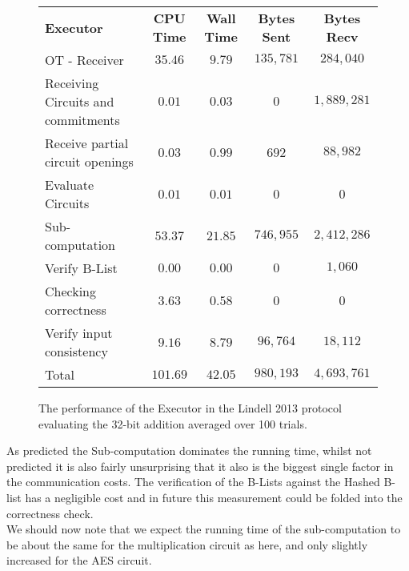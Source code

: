 \documentclass[ %
                    author={Nicholas Tutte},
                supervisor={Prof. Nigel Smart},
                    degree={MEng},
                     title={Secure Two Party Computation},
                  subtitle={A practical comparison of recent protocols},
                      type={Research - GG1K},
                      year={2015} ]{dissertation}
\begin{document}
				\begin{figure}[!ht]
					\begin{tabular}{| p{4.3cm} | c c c c |}
						\hline
						\textbf{Executor} & \textbf{CPU Time} & \textbf{Wall Time} & \textbf{Bytes Sent} & \textbf{Bytes Recv} \\
						\thickhline
						OT - Receiver & $35.46$ & $9.79$ & $135,781$ & $284,040$ \\
						\hline
						Receiving Circuits and commitments & $0.01$ & $0.03$ & $0$ & $1,889,281$ \\
						\hline
						Receive partial circuit openings & $0.03$ & $0.99$ & $692$ & $88,982$ \\
						\hline
						Evaluate Circuits & $0.01$ & $0.01$ & $0$ & $0$ \\
						\hline
						Sub-computation & $53.37$ & $21.85$ & $746,955$ & $2,412,286$ \\
						\hline
						Verify B-List & $0.00$ & $0.00$ & $0$ & $1,060$ \\
						\hline
						Checking correctness & $3.63$ & $0.58$ & $0$ & $0$ \\
						\hline
						Verify input consistency & $9.16$ & $8.79$ & $96,764$ & $18,112$ \\
						\thickhline
						Total & $101.69$ & $42.05$ & $980,193$ & $4,693,761$ \\
						\hline
					\end{tabular}
					\caption{The performance of the Executor in the Lindell 2013 protocol evaluating the 32-bit addition averaged over 100 trials. \label{table:L_2013_Add_Executor}}
				\end{figure}
				\FloatBarrier

				As predicted the Sub-computation dominates the running time, whilst not predicted it is also fairly unsurprising that it also is the biggest single factor in the communication costs. The verification of the B-Lists against the Hashed B-list has a negligible cost and in future this measurement could be folded into the correctness check.\\

				We should now note that we expect the running time of the sub-computation to be about the same for the multiplication circuit as here, and only slightly increased for the AES circuit.\\
\end{document}
